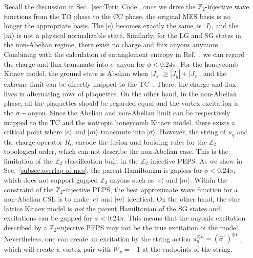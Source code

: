 \documentclass{ntuthesis}
\begin{document}
%
Recall the discussion in Sec.~\ref{sec:Toric Code}, once we drive the $\mathbb{Z}_2$-injective wave functions from the TO phase to the CC  phase, the original MES basis is no longer the appropriate basis. 
%
The $|e\rangle$ becomes  exactly the same as $|I\rangle$, and the $|m\rangle$ is not  a physical normalizable state. 
%
Similarly, for the LG and SG states in the non-Abelian regime, there exist no charge and flux anyons anymore. 
%
Combining with the calculation of entanglement entropy in Ref.~\cite{non-AbelianTO_2020}, we can  regard the charge and flux transmute into $\sigma$ anyon for $\phi < 0.24\pi$.
%
 For the honeycomb Kitaev model, the ground state is Abelian when $|J_x| \geq |J_y|+|J_z|$, and the extreme limit can be directly mapped to the TC~\cite{Kitaev2006}. 
%
There, the charge and flux lives in alternating rows of plaquettes. 
%
 On the other hand, in the non-Abelian phase, all the plaquettes should be regarded equal and the vortex excitation is the  $\sigma-$anyon.
Since the Abelian and non-Abelian limit can be respectively mapped to the TC and the isotropic  honeycomb  Kitaev model, there exists a critical point where $|e\rangle$ and $|m\rangle$ transmute into $|\sigma\rangle$.
%
However, the string of $u_g$ and the charge operator $R_\alpha$ encode the fusion and braiding rules for the $\mathbb{Z}_2$ topological order, which can not describe the  non-Abelian case. 
%
This is the limitation of the $\mathbb{Z}_2$ classification built in the $\mathbb{Z}_2$-injective PEPS.
%
As we  show in Sec.~\ref{subsec:overlap of mes}, the parent Hamiltonian is  gapless for $\phi < 0.24\pi$, which does not support gapped $\mathbb{Z}_2$ anyons such as $|e\rangle$ and $|m\rangle$.
%
Within the constraint of the  $\mathbb{Z}_2$-injective PEPS, the best approximate wave function for a non-Abelian CSL is to make $|e\rangle$ and $|m\rangle$ identical.
%
On the other hand, the   star lattice  Kitaev model is \textit{not} the parent Hamiltonian of the SG states  and  excitations can be gapped for $\phi < 0.24\pi$. 
%
This means that the anyonic excitation  described by a $\mathbb{Z}_2$-injective PEPS may not be the true excitation of the model. 
%
Nevertheless, one can create an excitation by the string action $u_g^{\otimes L} = (\hat{\sigma}^z)^{\otimes L}$, which will create a vortex pair with $W_p = -1$ at the endpoints of the string. 
%
%
%
%
%

\appendix

\backmatter
{}
{}
%
 


%
\end{document}
